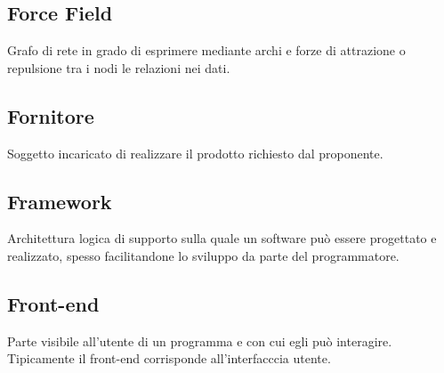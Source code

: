 \documentclass[../glossario.tex]{subfiles}
\begin{document}
\subsection*{Force Field}
Grafo di rete in grado di esprimere mediante archi e forze di attrazione o repulsione tra i nodi le relazioni nei dati.

\subsection*{Fornitore}
Soggetto incaricato di realizzare il prodotto richiesto dal proponente.

\subsection*{Framework}
Architettura logica di supporto sulla quale un software può essere progettato e realizzato, spesso facilitandone lo sviluppo da parte del programmatore.

\subsection*{Front-end}
Parte visibile all'utente di un programma e con cui egli può interagire. Tipicamente il front-end corrisponde all'interfacccia utente.

    
\end{document}

